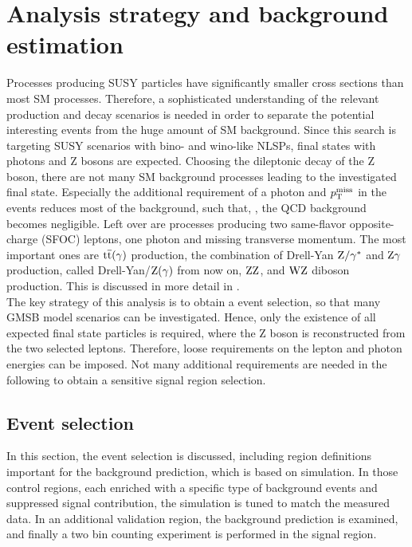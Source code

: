 \chapter{Analysis strategy and background estimation}\label{chap:analysis}
\minitoc
Processes producing SUSY particles have significantly smaller cross sections than most SM processes. Therefore, a sophisticated understanding of the relevant production and decay scenarios is needed in order to separate the potential interesting events from the huge amount of SM background. Since this search is targeting SUSY scenarios with bino- and wino-like NLSPs, final states with photons and Z bosons are expected. Choosing the dileptonic decay of the Z boson, there are not many SM background processes leading to the investigated final state. Especially the additional requirement of a photon and $p_{\mathrm{T}}^\text{miss}$ in the events reduces most of the background, such that, \eg, the QCD background becomes negligible. Left over are processes producing two same-flavor opposite-charge (SFOC) leptons, one photon and missing transverse momentum. The most important ones are ${\mathrm{t}\overline{\mathrm{t}}}(\gamma)$ production, the combination of Drell-Yan $\mathrm{Z}/\gamma^{*}$ and $\mathrm{Z}\gamma$ production, called Drell-Yan/$\mathrm{Z}(\gamma)$ from now on, $\mathrm{Z}\mathrm{Z}$, and $\mathrm{W}\mathrm{Z}$ diboson production. This is discussed in more detail in .\\
The key strategy of this analysis is to obtain a event selection, so that many GMSB model scenarios can be investigated. Hence, only the existence of all expected final state particles is required, where the Z boson is reconstructed from the two selected leptons. Therefore, loose requirements on the lepton and photon energies can be imposed. Not many additional requirements are needed in the following to obtain a sensitive signal region selection.

\section{Event selection}
In this section, the event selection is discussed, including region definitions important for the background prediction, which is based on simulation. In those control regions, each enriched with a specific type of background events and suppressed signal contribution, the simulation is tuned to match the measured data. In an additional validation region, the background prediction is examined, and finally a two bin counting experiment is performed in the signal region.
